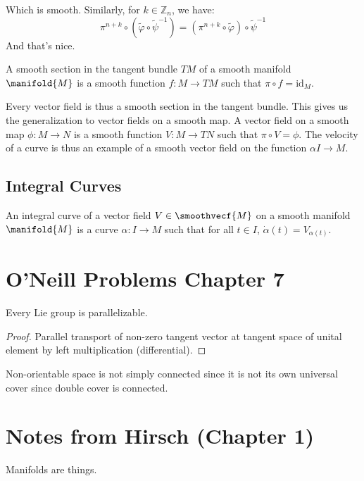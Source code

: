 \documentclass{article}                                                        %
\begin{document}
            Which is smooth. Similarly, for $k\in\mathbb{Z}_{n}$, we have:
            \begin{equation}
                \pi^{n+k}\circ(\tilde{\varphi}\circ\tilde{\psi}^{\minus{1}})
                =(\pi^{n+k}\circ\tilde{\varphi})\circ\tilde{\psi}^{\minus{1}}
            \end{equation}
            And that's nice.
            \begin{definition}
                A smooth section in the tangent bundle $TM$ of a smooth manifold
                $\manifold{M}$ is a smooth function $f:M\rightarrow{TM}$ such
                that $\pi\circ{f}=\textrm{id}_{M}$.
            \end{definition}
            Every vector field is thus a smooth section in the tangent bundle.
            This gives us the generalization to vector fields on a smooth map.
            A vector field on a smooth map $\phi:M\rightarrow{N}$ is a smooth
            function $V:M\rightarrow{TN}$ such that $\pi\circ{V}=\phi$. The
            velocity of a curve is thus an example of a smooth vector field on
            the function $\alpha{I}\rightarrow{M}$.
        \subsection{Integral Curves}
            \begin{definition}
                An integral curve of a vector field $V\in\smoothvecf{M}$ on a
                smooth manifold $\manifold{M}$ is a curve
                $\alpha:I\rightarrow{M}$ such that for all $t\in{I}$,
                $\dot{\alpha}(t)=V_{\alpha(t)}$.
            \end{definition}
    \section{O'Neill Problems Chapter 7}
            \begin{theorem}
                Every Lie group is parallelizable.
            \end{theorem}
            \begin{proof}
                Parallel transport of non-zero tangent vector at tangent space
                of unital element by left multiplication (differential).
            \end{proof}
            Non-orientable space is not simply connected since it is not its own
            universal cover since double cover is connected.
    \section{Notes from Hirsch (Chapter 1)}
        Manifolds are things.
\end{document}
